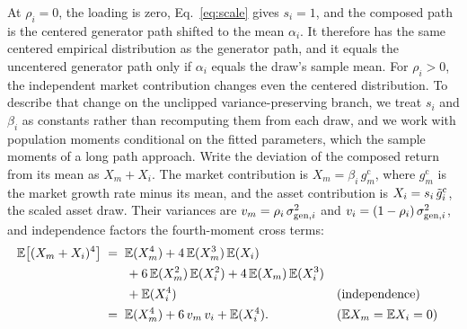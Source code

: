 At $\rho_i = 0$, the loading is zero, Eq.~\eqref{eq:scale} gives
$s_i = 1$, and the composed path is the centered generator path
shifted to the mean $\alpha_i$. It therefore has the same centered
empirical distribution as the generator path, and it equals the
uncentered generator path only if $\alpha_i$ equals the draw's sample
mean. For $\rho_i > 0$, the independent market contribution changes
even the centered distribution. To describe that change on the
unclipped variance-preserving branch, we treat $s_i$ and $\beta_i$ as
constants rather than recomputing them from each draw, and we work
with population moments conditional on the fitted parameters, which
the sample moments of a long path approach. Write the deviation of the
composed return from its mean as $X_m + X_i$. The market contribution
is $X_m = \beta_i\, g_m^{\mathrm c}$, where $g_m^{\mathrm c}$ is the
market growth rate minus its mean, and the asset contribution is
$X_i = s_i\, \tilde{g}_i^{\mathrm c}$, the scaled asset draw. Their variances
are $v_m = \rho_i\, \sigma_{\mathrm{gen},i}^2$ and
$v_i = (1 - \rho_i)\, \sigma_{\mathrm{gen},i}^2$, and independence factors the fourth-moment cross terms:
\begin{align}
  \mathbb{E}\big[(X_m + X_i)^4\big]
   &\;=\; \mathbb{E}(X_m^4) + 4\,\mathbb{E}(X_m^3)\,\mathbb{E}(X_i)
     \notag \\
   &\qquad + 6\,\mathbb{E}(X_m^2)\,\mathbb{E}(X_i^2)
     + 4\,\mathbb{E}(X_m)\,\mathbb{E}(X_i^3)
     \notag \\
   &\qquad + \mathbb{E}(X_i^4)
     && \text{(independence)} \notag \\
   &\;=\; \mathbb{E}(X_m^4) + 6\, v_m\, v_i + \mathbb{E}(X_i^4).
     && \text{($\mathbb{E} X_m = \mathbb{E} X_i = 0$)}
  \label{eq:supp-comp-fourth}
\end{align}

